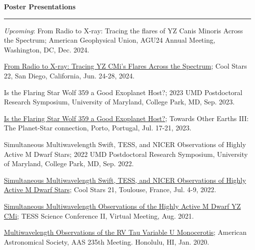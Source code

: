 \documentclass[letter,12pt]{article}
\begin{document}


\noindent
{\bf Poster Presentations} \\
\vspace{-10mm}
\begin{center}
\rule{\textwidth}{0.2mm}
\end{center}
\vspace{-3mm}
\noindent
\begin{etaremune}
\renewcommand\labelenumi{\bfseries\theenumi .}

\item \textit{Upcoming}: From Radio to X-ray: Tracing the flares of YZ Canis Minoris Across the Spectrum; American Geophysical Union, AGU24 Annual Meeting, Washington, DC, Dec. 2024.

\item \href{https://coolstars22.github.io/docs/CS22_Abstract_booklet.pdf}{From Radio to X-ray: Tracing YZ CMi's Flares Across the
Spectrum}; Cool Stars 22, San Diego, California, Jun. 24-28, 2024.

\item Is the Flaring Star Wolf 359 a Good Exoplanet Host?; 2023 UMD Postdoctoral Research Symposium, University of Maryland, College Park, MD, Sep. 2023.

\item \href{http://www.astro.up.pt/~sousasag/toe2023/Abstract_book_Posters.pdf}{Is the Flaring Star Wolf 359 a Good Exoplanet Host?}; Towards Other Earths III: The Planet-Star connection, Porto, Portugal, Jul. 17-21, 2023.

\item Simultaneous Multiwavelength Swift, TESS, and NICER Observations of Highly Active M Dwarf Stars; 2022 UMD Postdoctoral Research Symposium, University of Maryland, College Park, MD, Sep. 2022.

\item \href{https://coolstars21.github.io/docs/CS21booklet.pdf}{Simultaneous Multiwavelength Swift, TESS, and NICER Observations of Highly Active M Dwarf Stars}; Cool Stars 21, Toulouse, France, Jul. 4-9, 2022.

\item \href{https://zenodo.org/record/5142127#.YmbZsJPMJCV}{Simultaneous Multiwavelength Observations of the Highly Active M Dwarf YZ CMi}; TESS Science Conference II, Virtual Meeting, Aug. 2021.

\item \href{https://ui.adsabs.harvard.edu/abs/2020AAS...23510607V/abstract}{Multiwavelength Observations of the RV Tau Variable U Monocerotis}; American Astronomical Society, AAS 235th Meeting.  Honolulu, HI, Jan.  2020.


\end{etaremune}
\end{document}
